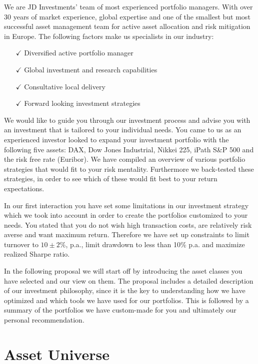 \documentclass[11pt, parskip=full, DIV=14]{scrreprt}
\begin{document}
We are JD Investments’ team of most experienced portfolio managers.
With over 30 years of market experience, global expertise and one of the smallest but most successful asset management team for active asset allocation and risk mitigation in Europe.
The following factors make us specialists in our industry: 

\begin{itemize}
\item[$\checkmark$] Diversified active portfolio manager
\item[$\checkmark$] Global investment and research capabilities 
\item[$\checkmark$] Consultative local delivery 
\item[$\checkmark$] Forward looking investment strategies 
\end{itemize}

We would like to guide you through our investment process and advise you with an investment that is tailored to your individual needs.
You came to us as an experienced investor looked to expand your investment portfolio with the following five assets: DAX, Dow Jones Industrial, Nikkei 225, iPath S\&P 500 and the risk free rate (Euribor).
We have compiled an overview of various portfolio strategies that would fit to your risk mentality.
Furthermore we back-tested these strategies, in order to see which of these would fit best to your return expectations.
  
In our first interaction you have set some limitations in our investment strategy which we took into account in order to create the portfolios customized to your needs.
You stated that you do not wish high transaction costs, are relatively risk averse and want maximum return.
Therefore we have set up constraints to limit turnover to $10 \pm 2\%$, p.a., limit drawdown to less than 10\% p.a. and maximize realized Sharpe ratio.

In the following proposal we will start off by introducing the asset classes you have selected and our view on them.
The proposal includes a detailed description of our investment philosophy, since it is the key to understanding how we have optimized and which tools we have used for our portfolios.
This is followed by a summary of the portfolios we have custom-made for you and ultimately our personal recommendation.


\chapter{Asset Universe}
\end{document}
